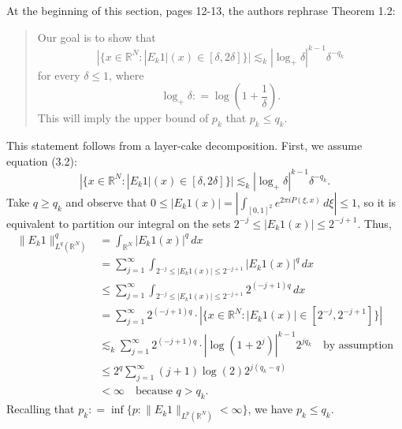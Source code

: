 \documentclass[12pt]{article}
\theoremstyle{definition}
\theoremstyle{remark}
\numberwithin{equation}{section}
\begin{document}
At the beginning of this section, pages 12-13, the authors rephrase Theorem 1.2: %
    \begin{quote}
        Our goal is to show that 
        \begin{equation*} %
            |\{ x\in\mathbb{R}^N\colon |E_k1|(x)\in[\delta,2\delta] \}| \lesssim_k |\log_+\delta|^{k-1}\delta^{-q_k} %
        \end{equation*}
        for every $\delta \leq 1$, where
        \begin{equation*}
            \log_+\delta \colon = \log(1+\frac{1}{\delta}). 
        \end{equation*}
        This will imply the upper bound of $p_k$ that $p_k \leq q_k$. 
    \end{quote}
This statement follows from a layer-cake decomposition. 
First, we assume equation (3.2): $$|\{ x\in\mathbb{R}^N\colon |E_k1|(x)\in[\delta,2\delta] \}| \lesssim_k |\log_+\delta|^{k-1}\delta^{-q_k}.$$
Take $q\geq q_k$ and observe that $0\leq |E_k1(x)| =\left| \int_{[0,1]^2} e^{2\pi i P(\xi,x)}\,d\xi \right| \leq 1$, so it is equivalent to partition our integral on the sets $2^{-j} \leq |E_k1(x)| \leq  2^{-j+1}$. 
Thus, 
\begin{align*}
    \| E_k1 \|_{L^q(\mathbb{R}^N)}^q &=  \int_{\mathbb{R}^N} |E_k1(x)|^q \,dx \\
    &= \sum_{j=1}^\infty \int_{2^{-j} \leq |E_k1(x)| \leq  2^{-j+1}} |E_k1(x)|^q\,dx \\
    &\leq \sum_{j=1}^\infty \int_{2^{-j} \leq |E_k1(x)| \leq  2^{-j+1}} 2^{(-j+1)q}\,dx  \\ 
    &= \sum_{j=1}^\infty 2^{(-j+1)q} \cdot \left| \{ x\in \mathbb{R}^N \colon |E_k1(x)| \in [2^{-j}, 2^{-j+1}] \} \right| \\
    &\lesssim_k \sum_{j=1}^\infty 2^{(-j+1)q}\cdot |\log(1+2^j)|^{k-1} 2^{jq_k} \quad\textrm{by assumption} \\
    &\leq 2^q \sum_{j=1}^\infty (j+1)\log(2) 2^{j(q_k-q)} \\
    &< \infty \quad \textrm{because $q>q_k$.}
\end{align*}
Recalling that $p_k \colon = \inf\{ p\colon \|E_k1\|_{L^p(\mathbb{R}^N)} < \infty\}$, we have $p_k\leq q_k$. 
\end{document}
